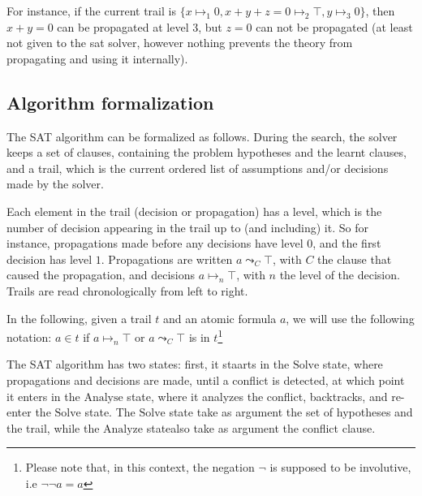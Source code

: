 For instance, if the current trail is $\{x \mapsto_1 0, x + y + z = 0 \mapsto_2 \top, y\mapsto_3 0\}$,
then $x + y = 0$ can be propagated at level $3$, but $z = 0$ can not be propagated (at least not
given to the sat solver, however nothing prevents the theory from propagating and using it internally).

\subsection{Algorithm formalization}

The SAT algorithm can be formalized as follows. During the search, the solver keeps
a set of clauses, containing the problem hypotheses and the learnt clauses, and
a trail, which is the current ordered list of assumptions and/or decisions made by
the solver.

Each element in the trail (decision or propagation) has a level, which is the number of decision
appearing in the trail up to (and including) it. So for instance, propagations made before any
decisions have level $0$, and the first decision has level $1$. Propagations are written
$a \leadsto_C \top$, with $C$ the clause that caused the propagation, and decisions
$a \mapsto_n \top$, with $n$ the level of the decision. Trails are read
chronologically from left to right.

In the following, given a trail $t$ and an atomic formula $a$, we will use the following notation:
$a \in t$ if $a \mapsto_n \top$ or $a \leadsto_C \top$ is in $t$\footnote{Please note that, in
this context, the negation $\neg$ is supposed to be involutive, i.e $\neg \neg a = a$}

The SAT algorithm has two states: first, it staarts in the $\text{Solve}$ state, where propagations
and decisions are made, until a conflict is detected, at which point it enters in the $\text{Analyse}$
state, where it analyzes the conflict, backtracks, and re-enter the $\text{Solve}$ state.
The $\text{Solve}$ state take as argument the set of hypotheses and the trail, while
the $\text{Analyze}$ statealso take as argument the conflict clause.

